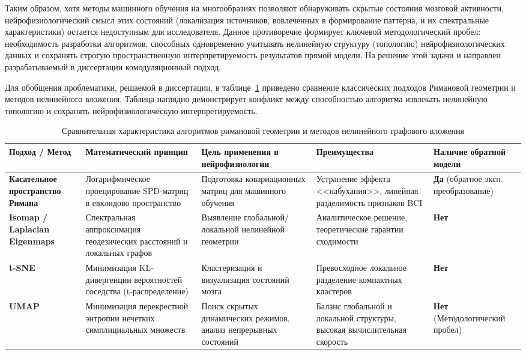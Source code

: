 Таким образом, хотя методы машинного обучения на многообразиях позволяют обнаруживать скрытые состояния мозговой активности, нейрофизиологический смысл этих состояний (локализация источников, вовлеченных в формирование паттерна, и их спектральные характеристики) остается недоступным для исследователя. Данное противоречие формирует ключевой методологический пробел: необходимость разработки алгоритмов, способных одновременно учитывать нелинейную структуру (топологию) нейрофизиологических данных и сохранять строгую пространственную интерпретируемость результатов прямой модели. На решение этой задачи и направлен разрабатываемый в диссертации комодуляционный подход.

Для обобщения проблематики, решаемой в диссертации, в таблице~\ref{tab:nonlinear_methods} приведено сравнение классических подходов Римановой геометрии и методов нелинейного вложения. Таблица наглядно демонстрирует конфликт между способностью алгоритма извлекать нелинейную топологию и сохранять нейрофизиологическую интерпретируемость.

\begin{table}
	\centering
	\caption{Сравнительная характеристика алгоритмов римановой геометрии и методов нелинейного графового вложения}
	\label{tab:nonlinear_methods}
	\renewcommand{\arraystretch}{1.4}
	\small
	\begin{tabular}{|p{3cm}|p{3.5cm}|p{3.5cm}|p{3.5cm}|p{2.5cm}|}
		\hline
		\textbf{Подход / Метод} & \textbf{Математический принцип} & \textbf{Цель применения в нейрофизиологии} & \textbf{Преимущества} & \textbf{Наличие обратной модели} \\
		\hline
		\textbf{Касательное пространство Римана} & Логарифмическое проецирование SPD-матриц в евклидово пространство & Подготовка ковариационных матриц для машинного обучения & Устранение эффекта <<набухания>>, линейная разделимость признаков BCI & \textbf{Да} (обратное эксп. преобразование) \\
		\hline
		\textbf{Isomap / Laplacian Eigenmaps} & Спектральная аппроксимация геодезических расстояний и локальных графов & Выявление глобальной/локальной нелинейной геометрии & Аналитическое решение, теоретические гарантии сходимости & \textbf{Нет} \\
		\hline
		\textbf{t-SNE} & Минимизация KL-дивергенции вероятностей соседства (t-распределение) & Кластеризация и визуализация состояний мозга & Превосходное локальное разделение компактных кластеров & \textbf{Нет} \\
		\hline
		\textbf{UMAP} & Минимизация перекрестной энтропии нечетких симплициальных множеств & Поиск скрытых динамических режимов, анализ непрерывных состояний & Баланс глобальной и локальной структуры, высокая вычислительная скорость & \textbf{Нет} (Методологический пробел) \\
		\hline
	\end{tabular}
\end{table}

